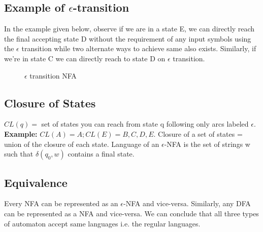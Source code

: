 \documentclass{report}
\begin{document}
\subsection{Example of $\epsilon$-transition}
In the example given below, observe if we are in a state E, we can directly reach the final accepting state D without the requirement of any input symbols using the $\epsilon$ transition while two alternate ways to achieve same also exists. Similarly, if we're in state C we can directly reach to state D on $\epsilon$ transition. 
\begin{figure}[ht] 
    \centering 
    \caption{$\epsilon$ transition NFA}
    \label{fig:my_label}
    \end{figure}
\subsection{Closure of States}
$CL(q)=$  set of states you can reach from state q following only arcs labeled $\epsilon$. \textbf{Example:} $CL(A) = {A}; CL(E) = {B, C, D, E}.$ Closure of a set of states = union of the closure of each state. Language of an $\epsilon$-NFA is the set of strings w such that $\delta(q_0,w)$ contains a final state.
\subsection{Equivalence}
Every NFA can be represented as an $\epsilon$-NFA and vice-versa. Similarly, any DFA can be represented as a NFA and vice-versa. We can conclude that all three types of automaton accept same languages i.e. the regular languages.

\end{document}
